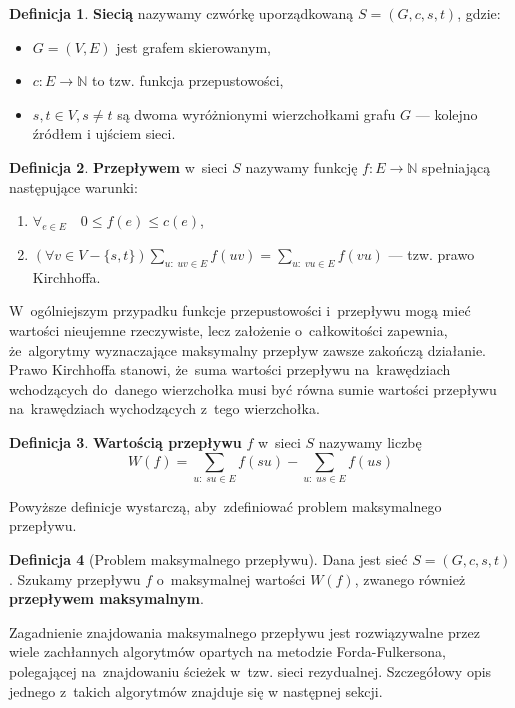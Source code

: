 \documentclass[12pt,a4paper]{article}
\theoremstyle{definition}
\newtheorem{defn}{Definicja}
\begin{document}
\begin{defn}
\textbf{Siecią} nazywamy czwórkę uporządkowaną $S = (G,c,s,t)$, gdzie:
\begin{itemize}
	\item $G = (V,E)$ jest grafem skierowanym,
	\item $c : E \to \mathbb{N}$ to tzw. funkcja przepustowości,
	\item $s,t \in V, s \neq t$ są dwoma wyróżnionymi wierzchołkami grafu $G$
	--- kolejno źródłem i ujściem sieci.
\end{itemize}
\end{defn}

\begin{defn}
\textbf{Przepływem} w~sieci $S$ nazywamy funkcję $f : E \to \mathbb{N}$
spełniającą następujące warunki:
\begin{enumerate}
	\item $\forall_{e \in E} \quad 0 \leqslant f(e) \leqslant c(e)$,
	\item $\displaystyle(\forall v \in V - \{ s,t \})
	\sum_{u : \; uv \in E} f(uv) = \sum_{u : \; vu \in E} f(vu)$ 
	--- tzw. prawo Kirchhoffa.
\end{enumerate}
\end{defn}

\noindent
W~ogólniejszym przypadku funkcje przepustowości i~przepływu mogą mieć wartości
nieujemne rzeczywiste, lecz założenie o~całkowitości zapewnia, że~algorytmy
wyznaczające maksymalny przepływ zawsze zakończą działanie.\\

\noindent
Prawo Kirchhoffa stanowi, że~suma wartości przepływu na~krawędziach wchodzących
do~danego wierzchołka musi być równa sumie wartości przepływu na~krawędziach
wychodzących z~tego wierzchołka.

\begin{defn}
\textbf{Wartością przepływu} $f$ w~sieci $S$ nazywamy liczbę
$$ W(f) = \sum_{u: \; su \in E} f(su) - \sum_{u: \; us \in E} f(us) $$
\end{defn}

\noindent
Powyższe definicje wystarczą, aby~zdefiniować problem maksymalnego przepływu.

\begin{defn}[Problem maksymalnego przepływu]
Dana jest sieć $S = (G,c,s,t)$. Szukamy przepływu $f$ o~maksymalnej wartości
$W(f)$, zwanego również \textbf{przepływem maksymalnym}.
\end{defn}

\noindent
Zagadnienie znajdowania maksymalnego przepływu jest rozwiązywalne przez
wiele zachłannych algorytmów opartych na metodzie Forda-Fulkersona,
polegającej na~znajdowaniu ścieżek w~tzw. sieci rezydualnej. Szczegółowy
opis jednego z~takich algorytmów znajduje się w następnej sekcji.
\end{document}
